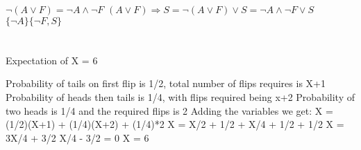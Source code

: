 \documentclass[a4paper]{article}
\begin{document}
${\neg(A \lor F) = \neg A \land \neg F}$ \newline 
${(A \lor F) \Rightarrow S = \neg(A \lor F) \lor S} = \neg A \land \neg F \lor S$ \newline
$\{\neg A\} \{\neg F, S\}$ \newline

\section{}
Expectation of X = 6

Probability of tails on first flip is 1/2, total number of flips requires is X+1 \newline
Probability of heads then tails is 1/4, with flips required being x+2 \newline
Probability of two heads is 1/4 and the required flips is 2 \newline
\newline
Adding the variables we get:\newline
X = (1/2)(X+1) + (1/4)(X+2) + (1/4)*2
X = X/2 + 1/2 + X/4 + 1/2 + 1/2
X = 3X/4 + 3/2
X/4 - 3/2 = 0
X = 6
\end{document}
